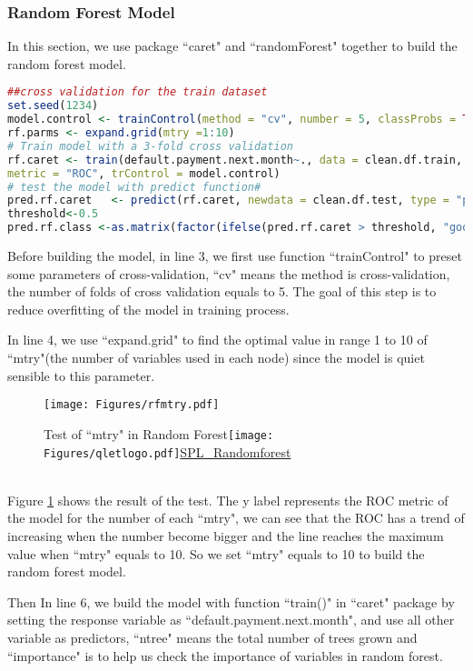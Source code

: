\documentclass[a4paper,11pt]{article}
\begin{document}
\subsubsection{Random Forest Model}
In this section, we use package ``caret" and ``randomForest" together to build the random forest model.
\begin{lstlisting}[language=R]
##cross validation for the train dataset
set.seed(1234)
model.control <- trainControl(method = "cv", number = 5, classProbs = TRUE, summaryFunction = twoClassSummary, allowParallel = TRUE )
rf.parms <- expand.grid(mtry =1:10)
# Train model with a 3-fold cross validation 
rf.caret <- train(default.payment.next.month~., data = clean.df.train, importance = T, method = "rf", ntree = 500, tuneGrid = rf.parms, 
metric = "ROC", trControl = model.control)
# test the model with predict function#
pred.rf.caret   <- predict(rf.caret, newdata = clean.df.test, type = "prob")[,2]
threshold<-0.5
pred.rf.class <-as.matrix(factor(ifelse(pred.rf.caret > threshold, "good",  "default")))
\end{lstlisting}
Before building the model, in line 3, we first use function ``trainControl" to preset some parameters of cross-validation, ``cv" means the method is cross-validation, the number of folds of cross validation equals to 5. The goal of this step is to reduce overfitting of the model in training process.

In line 4, we use ``expand.grid" to find the optimal value in range 1 to 10 of ``mtry"(the number of variables used in each node) since the model is quiet sensible to this parameter. 
 \begin{figure}[!ht] 
	\centering\texttt{[image: Figures/rfmtry.pdf]} 
	\caption{Test of ``mtry" in Random Forest\protect\texttt{[image: Figures/qletlogo.pdf]}\href{https://github.com/Jingmin24/R-programming/tree/master/SPL_RandomForest}{SPL\_Randomforest}}\label{fig:rfmtry} 
\end{figure}\\
Figure \ref{fig:rfmtry} shows the result of the test. The y label represents the ROC metric of the model for the number of each ``mtry", we can see that the ROC has a trend of increasing when the number become bigger and the line reaches the maximum value when ``mtry" equals to 10. So we set ``mtry" equals to 10 to build the random forest model. 

Then In line 6, we build the model with function ``train()" in ``caret" package by setting the response variable as ``default.payment.next.month", and use all other variable as predictors, ``ntree" means the total number of trees grown and ``importance" is to help us check the importance of variables in random forest.
\end{document}
